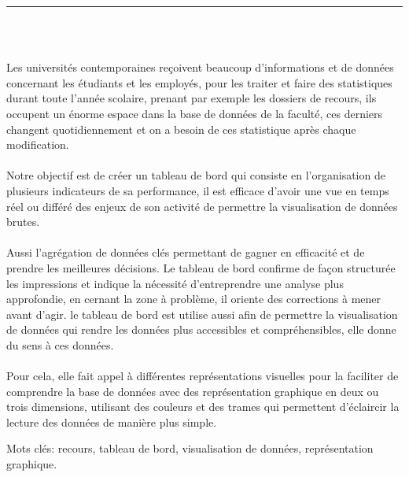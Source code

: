 \documentclass[12pt]{report}
\newenvironment{changemargin}[2]{%
\begin{list}{}{%
\setlength{\topsep}{0pt}%
\setlength{\leftmargin}{#1}%
\setlength{\rightmargin}{#2}%
\setlength{\listparindent}{\parindent}%
\setlength{\itemindent}{\parindent}%
\setlength{\parsep}{\parskip}%
}%
\item[]}{\end{list}}
\begin{document}
\begin{center}
    {\color{Blue} \rule{3in}{1.4mm} }\\
    \vspace{0.1in}
    \scshape{\fontsize{34}{46}{\bfseries{\color{Blue}{Résumé}}}}
    \\
    \vspace{0.6in}
\end{center}
\begin{changemargin}{0.9cm}{0.9cm}
Les universités contemporaines reçoivent beaucoup d’informations et de données concernant les étudiants et les employés, pour les traiter et faire des statistiques durant toute l’année scolaire, prenant par exemple les dossiers de recours, ils occupent un énorme espace dans la base de données de la faculté, ces derniers changent quotidiennement et on a besoin de ces statistique après chaque modification.
\\\\
Notre objectif est de créer un tableau de bord qui consiste en l'organisation de plusieurs indicateurs de sa performance, il est efficace d’avoir une vue en temps réel ou différé des enjeux de son activité de permettre la visualisation de données brutes.
\\\\
Aussi l’agrégation de données clés permettant de gagner en efficacité et de prendre les meilleures décisions. Le tableau de bord confirme de façon structurée les impressions et  indique la nécessité d’entreprendre une analyse plus approfondie, en cernant la zone à problème, il oriente des corrections à mener avant d’agir. le tableau de bord est utilise aussi afin de permettre la visualisation de données qui rendre les données plus accessibles et compréhensibles, elle donne du sens à ces données.
\\\\
Pour cela, elle fait appel à différentes représentations visuelles pour la faciliter de comprendre la base de données avec des représentation graphique en deux ou trois dimensions, utilisant des couleurs et des trames qui permettent d'éclaircir la lecture des données de manière plus simple.
\end{changemargin}

\vspace{1in}

\begin{changemargin}{0.9cm}{0.9cm}
Mots clés: recours, tableau de bord, visualisation de données, représentation graphique.
\end{changemargin}
\end{document}
